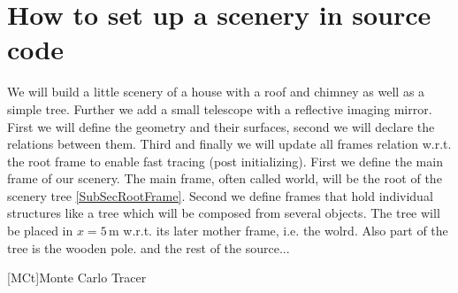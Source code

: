 \documentclass[11pt,a4paper,oneside,titlepage]{book}
\begin{document}
\chapter{How to set up a scenery in source code}
%
We will build a little scenery of a house with a roof and chimney as well as a simple tree. Further we add a small telescope with a reflective imaging mirror.
%
First we will define the geometry and their surfaces, second we will declare the relations between them. Third and finally we will update all frames relation w.r.t. the root frame to enable fast tracing (post initializing).
% 
%
First we define the main frame of our scenery. The main frame, often called world, will be the root of the scenery tree \ref{SubSecRootFrame}. 
%
%
Second we define frames that hold individual structures like a tree which will be composed from several objects. The tree will be placed in $x=5\,$m w.r.t. its later mother frame, i.e. the wolrd. 
%
Also part of the tree is the wooden pole.
and the rest of the source...

\renewcommand{\bibname}{References}

  
\addcontentsline{toc}{chapter}{\bibname}
%
\begin{acronym}
    [MCt]{Monte Carlo Tracer}
\end{acronym}
\end{document}

